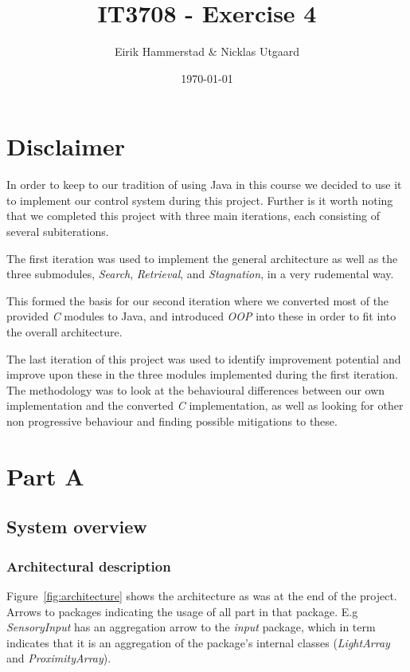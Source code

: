 \documentclass[12pt]{article}
\title{IT3708 - Exercise 4}
\author{
        Eirik Hammerstad \& Nicklas Utgaard
}
\date{\today}
\newcommand{\shiftline}[0]{\hfill\newline\noindent}
\begin{document}
\maketitle
\section{Disclaimer}
In order to keep to our tradition of using Java in this course we decided to use it to implement our control system during this project. 
Further is it worth noting that we completed this project with three main iterations, each consisting of several subiterations. 

\shiftline The first iteration was used to implement the general architecture as well as the three submodules, 
	\textit{Search}, \textit{Retrieval}, and \textit{Stagnation}, in a very rudemental way.

\shiftline This formed the basis for our second iteration where we converted most of the provided \textit{C} modules to Java, 
	and introduced \textit{OOP} into these in order to fit into the overall architecture.

\shiftline 	The last iteration of this project was used to identify improvement potential and improve upon these in the three modules implemented during the first iteration. 
The methodology was to look at the behavioural differences between our own implementation and the converted \textit{C} implementation, as well as looking for other 
non progressive behaviour and finding possible mitigations to these.

\section{Part A}
	\subsection{System overview}
		\subsubsection{Architectural description}
			Figure~\ref{fig:architecture} shows the architecture as was at the end of the project. 
			Arrows to packages indicating the usage of all part in that package. 
			E.g \textit{SensoryInput} has an aggregation arrow to the \textit{input} package, which in term indicates that it is an aggregation 
			of the package's internal classes (\textit{LightArray} and \textit{ProximityArray}).
			
\end{document}
